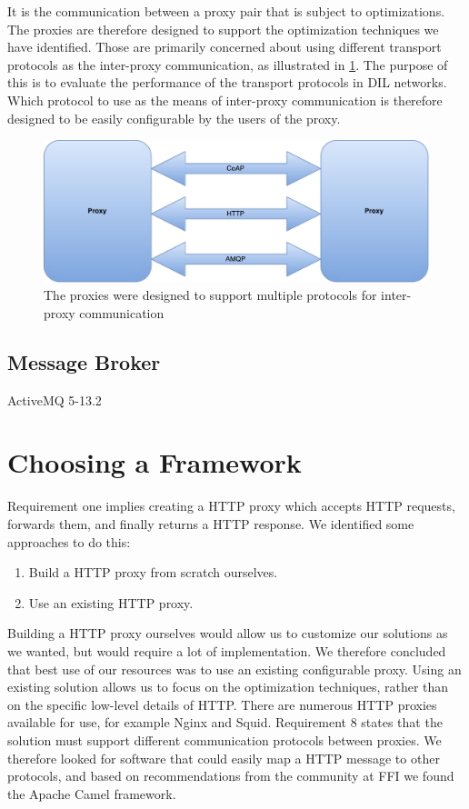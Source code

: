 It is the communication between a proxy pair that is subject to optimizations.
The proxies are therefore designed to support the optimization techniques we
have identified. Those are primarily concerned about using different transport
protocols as the inter-proxy communication, as illustrated in
\cref{figure:proxy-communication}. The purpose of this is to evaluate the
performance of the transport protocols in DIL networks. Which protocol to use as
the means of inter-proxy communication is therefore designed to be easily
configurable by the users of the proxy.

\begin{figure}[h]
\includegraphics[scale=0.5]{images/proxy_communcation.pdf}
\caption{The proxies were designed to support multiple protocols for inter-proxy communication}
\label{figure:proxy-communication}
\end{figure}

\subsection{Message Broker}

ActiveMQ 5-13.2

\section{Choosing a Framework}

Requirement one implies creating a HTTP proxy which accepts HTTP requests,
forwards them, and finally returns a HTTP response. We identified some
approaches to do this:

\begin{enumerate}
    \item Build a HTTP proxy from scratch ourselves.
    \item Use an existing HTTP proxy.
\end{enumerate}

Building a HTTP proxy ourselves would allow us to customize our solutions as we
wanted, but would require a lot of implementation. We therefore concluded that
best use of our resources was to use an existing configurable proxy. Using an
existing solution allows us to focus on the optimization techniques, rather
than on the specific low-level details of HTTP. There are numerous HTTP proxies
available for use, for example Nginx\cite{nginx-homepage} and
Squid\cite{squid-homepage}. Requirement 8 states that the solution must support
different communication protocols between proxies. We therefore looked for
software that could easily map a HTTP message to other protocols, and based on
recommendations from the community at FFI we found the Apache Camel framework.

